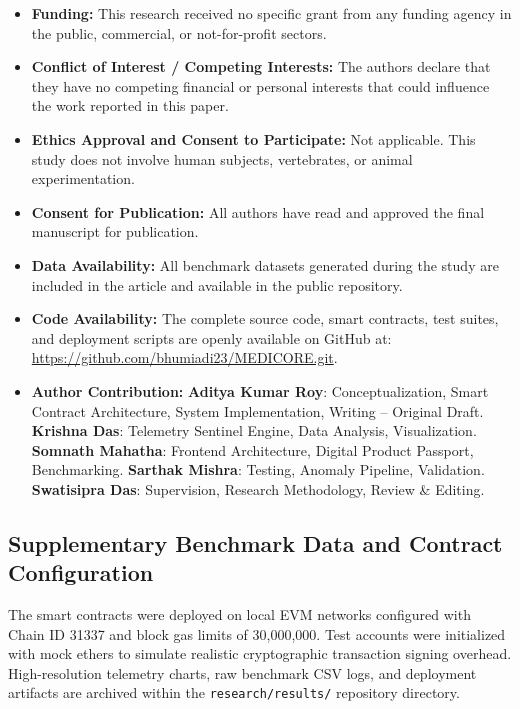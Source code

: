 \documentclass[pdflatex,sn-mathphys-num]{sn-jnl}
\theoremstyle{thmstyleone}
\theoremstyle{thmstyletwo}
\theoremstyle{thmstylethree}
\begin{document}
\begin{itemize}
    \item \textbf{Funding:} This research received no specific grant from any funding agency in the public, commercial, or not-for-profit sectors.
    \item \textbf{Conflict of Interest / Competing Interests:} The authors declare that they have no competing financial or personal interests that could influence the work reported in this paper.
    \item \textbf{Ethics Approval and Consent to Participate:} Not applicable. This study does not involve human subjects, vertebrates, or animal experimentation.
    \item \textbf{Consent for Publication:} All authors have read and approved the final manuscript for publication.
    \item \textbf{Data Availability:} All benchmark datasets generated during the study are included in the article and available in the public repository.
    \item \textbf{Code Availability:} The complete source code, smart contracts, test suites, and deployment scripts are openly available on GitHub at: \url{https://github.com/bhumiadi23/MEDICORE.git}.
    \item \textbf{Author Contribution:} \textbf{Aditya Kumar Roy}: Conceptualization, Smart Contract Architecture, System Implementation, Writing -- Original Draft. \textbf{Krishna Das}: Telemetry Sentinel Engine, Data Analysis, Visualization. \textbf{Somnath Mahatha}: Frontend Architecture, Digital Product Passport, Benchmarking. \textbf{Sarthak Mishra}: Testing, Anomaly Pipeline, Validation. \textbf{Swatisipra Das}: Supervision, Research Methodology, Review \& Editing.
\end{itemize}

\begin{appendices}

\section{Supplementary Benchmark Data and Contract Configuration}\label{secA1}
The smart contracts were deployed on local EVM networks configured with Chain ID 31337 and block gas limits of 30,000,000. Test accounts were initialized with mock ethers to simulate realistic cryptographic transaction signing overhead. High-resolution telemetry charts, raw benchmark CSV logs, and deployment artifacts are archived within the \texttt{research/results/} repository directory.

\end{appendices}
\end{document}
